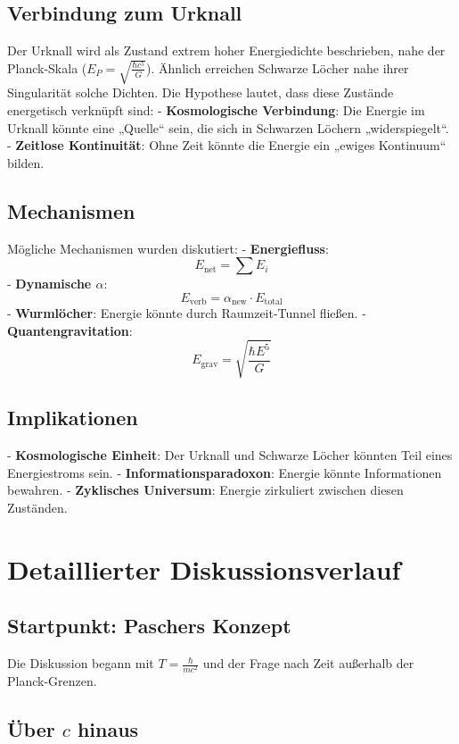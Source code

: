 \documentclass{article}
\begin{document}
	\subsection{Verbindung zum Urknall}
	
	Der Urknall wird als Zustand extrem hoher Energiedichte beschrieben, nahe der Planck-Skala (\( E_P = \sqrt{\frac{\hbar c^5}{G}} \)). Ähnlich erreichen Schwarze Löcher nahe ihrer Singularität solche Dichten. Die Hypothese lautet, dass diese Zustände energetisch verknüpft sind:
	- \textbf{Kosmologische Verbindung}: Die Energie im Urknall könnte eine „Quelle“ sein, die sich in Schwarzen Löchern „widerspiegelt“.
	- \textbf{Zeitlose Kontinuität}: Ohne Zeit könnte die Energie ein „ewiges Kontinuum“ bilden.
	
	\subsection{Mechanismen}
	
	Mögliche Mechanismen wurden diskutiert:
	- \textbf{Energiefluss}:
	\[
	E_{\text{net}} = \sum E_i
	\]
	- \textbf{Dynamische \( \alpha \)}:
	\[
	E_{\text{verb}} = \alpha_{\text{new}} \cdot E_{\text{total}}
	\]
	- \textbf{Wurmlöcher}: Energie könnte durch Raumzeit-Tunnel fließen.
	- \textbf{Quantengravitation}:
	\[
	E_{\text{grav}} = \sqrt{\frac{\hbar E^5}{G}}
	\]
	
	\subsection{Implikationen}
	
	- \textbf{Kosmologische Einheit}: Der Urknall und Schwarze Löcher könnten Teil eines Energiestroms sein.
	- \textbf{Informationsparadoxon}: Energie könnte Informationen bewahren.
	- \textbf{Zyklisches Universum}: Energie zirkuliert zwischen diesen Zuständen.
	
	\section{Detaillierter Diskussionsverlauf}
	
	\subsection{Startpunkt: Paschers Konzept}
	
	Die Diskussion begann mit \( T = \frac{\hbar}{mc^2} \) und der Frage nach Zeit außerhalb der Planck-Grenzen.
	
	\subsection{Über \( c \) hinaus}
	
\end{document}
